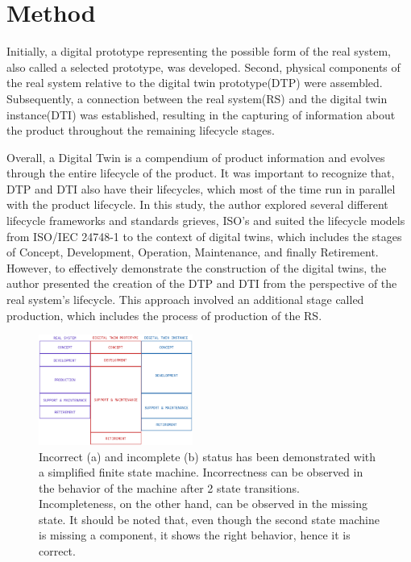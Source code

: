 \documentclass[conference]{IEEEtran}
\begin{document}
    \section{Method}\label{section:Method}
    Initially, a digital prototype representing the possible form of the real system, 
    also called a selected prototype, was developed. Second, physical components of the real system 
    relative to the digital twin prototype(DTP) were assembled. Subsequently, a connection between the real system(RS) 
    and the digital twin instance(DTI) was established, 
    resulting in the capturing of information about the product throughout the remaining lifecycle stages.

    Overall, a Digital Twin is a compendium of product information and evolves through the entire lifecycle of the product.
    It was important to recognize that, DTP and DTI also have their lifecycles,
    which most of the time run in parallel with the product lifecycle. 
    In this study, the author explored several different lifecycle frameworks and standards {grieves, ISO's} and 
    suited the lifecycle models from ISO/IEC 24748-1 to the context of digital twins, which includes the stages of  
    Concept, Development, Operation, Maintenance, and finally Retirement.  However, to effectively demonstrate the construction of the digital twins, 
    the author presented the creation of the DTP and DTI from the perspective of the real system's lifecycle. This approach involved an additional stage called production, 
    which includes the process of production of the RS.
    
    \begin{figure}[htbp]
        \centering
        \includegraphics[width=0.45\textwidth]{LIFECYCLE.png}
        \caption{Incorrect (a) and incomplete (b) status has been demonstrated with a simplified finite state machine. Incorrectness can be observed in the behavior 
        of the machine after 2 state transitions. Incompleteness, on the other hand, can be observed in the missing state. It should be noted that, even though the second state machine is missing a 
        component, it shows the right behavior, hence it is correct.}\label{fig:LIFECYCLE}
    \end{figure}
    
\end{document}
